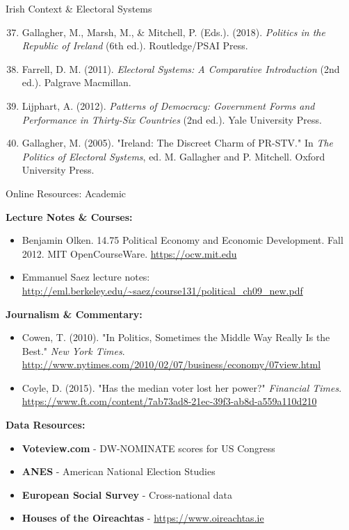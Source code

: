\documentclass[10pt]{beamer}
\begin{document}
\begin{frame}{Irish Context \& Electoral Systems}
\footnotesize
\begin{enumerate}
\setcounter{enumi}{36}
\item Gallagher, M., Marsh, M., \& Mitchell, P. (Eds.). (2018). \emph{Politics in the Republic of Ireland} (6th ed.). Routledge/PSAI Press.
\item Farrell, D. M. (2011). \emph{Electoral Systems: A Comparative Introduction} (2nd ed.). Palgrave Macmillan.
\item Lijphart, A. (2012). \emph{Patterns of Democracy: Government Forms and Performance in Thirty-Six Countries} (2nd ed.). Yale University Press.
\item Gallagher, M. (2005). "Ireland: The Discreet Charm of PR-STV." In \emph{The Politics of Electoral Systems}, ed. M. Gallagher and P. Mitchell. Oxford University Press.
\end{enumerate}
\end{frame}

\begin{frame}{Online Resources: Academic}
\footnotesize

\textbf{Lecture Notes \& Courses:}
\begin{itemize}
\item Benjamin Olken. 14.75 Political Economy and Economic Development. Fall 2012. MIT OpenCourseWare. \url{https://ocw.mit.edu}
\item Emmanuel Saez lecture notes: \url{http://eml.berkeley.edu/~saez/course131/political_ch09_new.pdf}
\end{itemize}


\textbf{Journalism \& Commentary:}
\begin{itemize}
\item Cowen, T. (2010). "In Politics, Sometimes the Middle Way Really Is the Best." \emph{New York Times}. \url{http://www.nytimes.com/2010/02/07/business/economy/07view.html}
\item Coyle, D. (2015). "Has the median voter lost her power?" \emph{Financial Times}. \url{https://www.ft.com/content/7ab73ad8-21ec-39f3-ab8d-a559a110d210}
\end{itemize}


\textbf{Data Resources:}
\begin{itemize}
\item \textbf{Voteview.com} - DW-NOMINATE scores for US Congress
\item \textbf{ANES} - American National Election Studies
\item \textbf{European Social Survey} - Cross-national data
\item \textbf{Houses of the Oireachtas} - \url{https://www.oireachtas.ie}
\end{itemize}
\end{frame}
\end{document}
